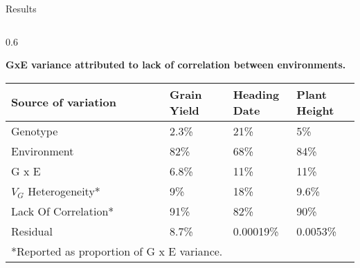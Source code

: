 \documentclass[final]{beamer}
\newlength{\onecolwid}
\newlength{\twocolwid}
\begin{document}
\begin{frame}[t]
\begin{columns}[t]
\begin{column}{\twocolwid}

\begin{block}{Results}

\begin{columns}[t,totalwidth=\twocolwid] %


\begin{column}{0.6\onecolwid} %





\begin{footnotesize}

\textbf{GxE variance attributed to lack of correlation between environments.}

\end{footnotesize}



\begin{scriptsize}

\begin{table}[!h]
\centering
\begin{tabular}{p{0.45\linewidth} p{0.1833333\linewidth} p{0.1833333\linewidth} p{0.1833333\linewidth}}
\toprule
\textbf{Source of variation} & \textbf{Grain Yield} & \textbf{Heading Date} & \textbf{Plant Height} \\
\midrule
Genotype & 2.3\% & 21\% & 5\%\\
Environment & 82\% & 68\% & 84\%\\
G x E & 6.8\% & 11\% & 11\%\\
\hspace{0.1cm} $V_G$ Heterogeneity* & \hspace{0.1cm} 9\% & \hspace{0.1cm} 18\% & \hspace{0.1cm} 9.6\%\\
\hspace{0.1cm} Lack Of  Correlation* & \hspace{0.1cm} 91\% & \hspace{0.1cm} 82\% & \hspace{0.1cm} 90\%\\
Residual & 8.7\% & 0.00019\% & 0.0053\%\\
\bottomrule
\multicolumn{4}{l}{\tiny{*Reported as proportion of G x E variance.}}\\
\end{tabular}
\end{table}


\end{scriptsize}
\end{column}
\end{columns}
\end{block}
\end{column}
\end{columns}
\end{frame}
\end{document}
